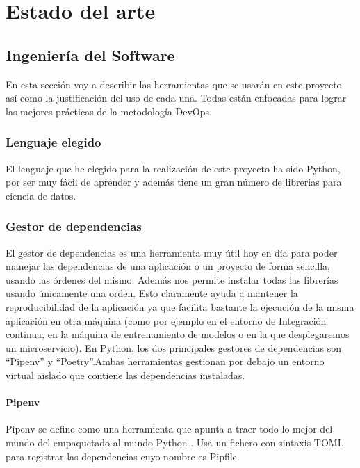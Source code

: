 \chapter{Estado del arte}

\section{Ingeniería del Software}

En esta sección voy a describir las herramientas que se usarán en este proyecto así como la justificación del uso de cada una. Todas están enfocadas para lograr las mejores prácticas de la metodología DevOps.

\subsection{Lenguaje elegido}

El lenguaje que he elegido para la realización de este proyecto ha sido Python, por ser muy fácil de aprender y además tiene un gran número de librerías para ciencia de datos.

\subsection{Gestor de dependencias}

El gestor de dependencias es una herramienta muy útil hoy en día para poder manejar las dependencias de una aplicación o un proyecto de forma sencilla, usando las órdenes del mismo. Además nos permite instalar todas las librerías usando únicamente una orden. Esto claramente ayuda a mantener la reproducibilidad de la aplicación ya que facilita bastante la ejecución de la misma aplicación en otra máquina (como por ejemplo en el entorno de Integración continua, en la máquina de entrenamiento de modelos o en la que desplegaremos un microservicio). En Python, los dos principales gestores de dependencias son \enquote{Pipenv} y \enquote{Poetry}.Ambas herramientas gestionan por debajo un entorno virtual aislado que contiene las dependencias instaladas.

\subsubsection*{Pipenv}

Pipenv se define como una herramienta que apunta a traer todo lo mejor del mundo del empaquetado al mundo Python \cite{pipenv}. Usa un fichero con sintaxis TOML para registrar las dependencias cuyo nombre es Pipfile.

